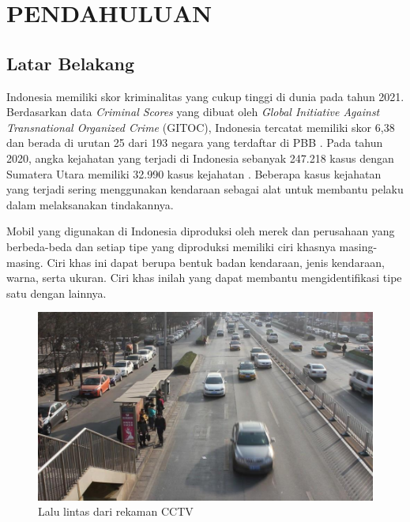 \chapter{PENDAHULUAN}
\label{chap:pendahuluan}

\section{Latar Belakang}
\label{sec:latarbelakang}

Indonesia memiliki skor kriminalitas yang cukup tinggi di dunia pada tahun 2021. \linebreak
Berdasarkan data \emph{Criminal Scores} yang dibuat oleh \emph{Global Initiative Against Transnational Organized Crime} 
(GITOC), Indonesia tercatat memiliki skor 6,38 dan berada di urutan 25 dari 193 negara yang 
terdaftar di PBB \parencite{Gitoc2021}. Pada tahun 2020, angka kejahatan yang terjadi di Indonesia 
sebanyak 247.218 kasus dengan Sumatera Utara memiliki 32.990 kasus kejahatan \parencite{Bpskriminal2021}.
Beberapa kasus kejahatan yang terjadi sering menggunakan kendaraan sebagai alat untuk membantu pelaku 
dalam melaksanakan tindakannya.

Mobil yang digunakan di Indonesia diproduksi oleh merek dan perusahaan yang berbeda-beda 
dan setiap tipe yang diproduksi memiliki ciri khasnya masing-masing. Ciri khas ini dapat 
berupa bentuk badan kendaraan, jenis kendaraan, warna, serta ukuran. Ciri khas inilah 
yang dapat membantu mengidentifikasi tipe satu dengan lainnya.

\begin{figure}[ht]
      \centering
      \includegraphics[scale=0.3]{gambar/Mobil.jpg}
      \caption{Lalu lintas dari rekaman CCTV}
      \label{fig:RekamanCCTV}
\end{figure}

